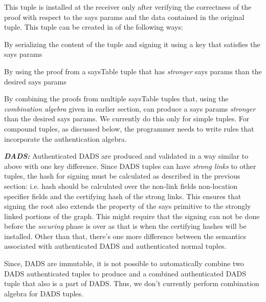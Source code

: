 This tuple is installed at the receiver only after verifying the correctness of the proof with respect to the says params and the data contained in the original tuple. This tuple can be created in of the following ways:
\be
\item By serializing the content of the tuple and signing it using a key that satisfies the says params
\item By using the proof from a saysTable tuple that has {\em stronger} says params than the desired says params 
\item By combining the proofs from multiple saysTable tuples that, using the {\em combination algebra} given in earlier section, can produce a says params {\em stronger} than the desired says params. We currently do this only for simple tuples. For compound tuples, as discussed below, the programmer needs to write rules that incorporate the authentication algebra.
\ee

\noindent\textit{\textbf{DADS:}} Authenticated DADS are produced and validated in a way similar to above with one key difference. Since DADS tuples can have {\em strong links} to other tuples, the hash for signing must be calculated as described in the previous section: i.e. hash should be calculated over the non-link fields non-location specifier fields and the certifying hash of the strong links. This ensures that signing the root also extends the property of the says primitive to the strongly linked portions of the graph. This might require that the signing can not be done before the {\em securing} phase is over as that is when the certifying hashes will be installed. Other than that, there's one more difference between the semantics associated with authenticated DADS and authenticated normal tuples.

Since, DADS are immutable, it is not possible to automatically combine two DADS authenticated tuples to produce and a combined authenticated DADS tuple that also is a part of DADS. Thus, we don't currently perform combination algebra for DADS tuples.
